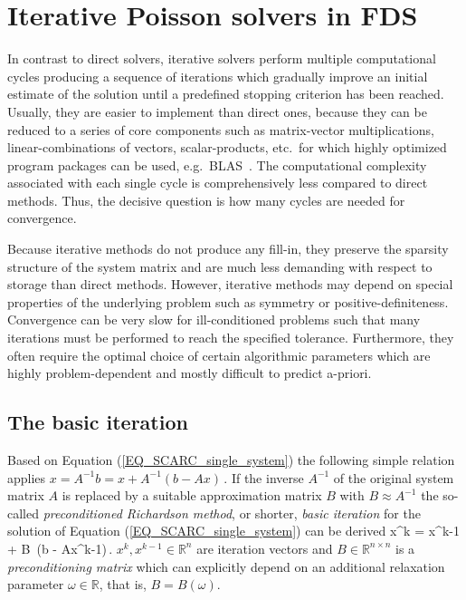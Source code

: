 \section{Iterative Poisson solvers in FDS}
In contrast to direct solvers, iterative solvers perform multiple computational cycles producing a sequence of iterations which gradually improve an initial estimate of the solution until a predefined stopping criterion has been reached. 
%
Usually, they are easier to implement than direct ones, because they can be reduced to a series of core components such as matrix-vector multiplications, linear-combinations of vectors, scalar-products, etc.\ for which highly optimized program packages can be used, e.g.\ BLAS~\cite{Dongarra:2002}.
%
The computational complexity associated with each single cycle is comprehensively less compared to direct methods. Thus, the decisive question is how many cycles are needed for convergence.

Because iterative methods do not produce any fill-in, they preserve the sparsity structure of the system matrix and are much less demanding with respect to storage than direct methods.
%
However, iterative methods may depend on special properties of the underlying problem such as symmetry or positive-definiteness. Convergence can be very slow for ill-conditioned problems such that many iterations must be performed to reach the specified tolerance. Furthermore, they often require the optimal choice of certain algorithmic parameters which are highly problem-dependent and mostly difficult to predict a-priori.


\subsection{The basic iteration}
\label{SEC_SCARC_basic_iteration}
Based on Equation (\ref{EQ_SCARC_single_system}) the following simple relation applies
$ %
x = A^{-1} b = x + A^{-1} (b-Ax)\,.
$ %
If the inverse $A^{-1}$ of the original system matrix $A$ is replaced by a suitable approximation matrix $B$ with $B \approx A^{-1}$
the so-called {\it preconditioned Richardson method}, or shorter, {\it basic iteration} for the solution of Equation (\ref{EQ_SCARC_single_system}) can be derived
\be 
  x^k = x^{k-1} + B\, (b - Ax^{k-1})\,. 
\label{EQ_SCARC_basic_iteration}
\ee
$x^k, x^{k-1} \in \mathbb{R}^{n}$ are iteration vectors and
$B \in \mathbb{R}^{n \times n}$ is a {\it preconditioning matrix} which can explicitly depend on an additional relaxation parameter $\omega\in \mathbb{R}$, that is, $B = B(\omega)$.

